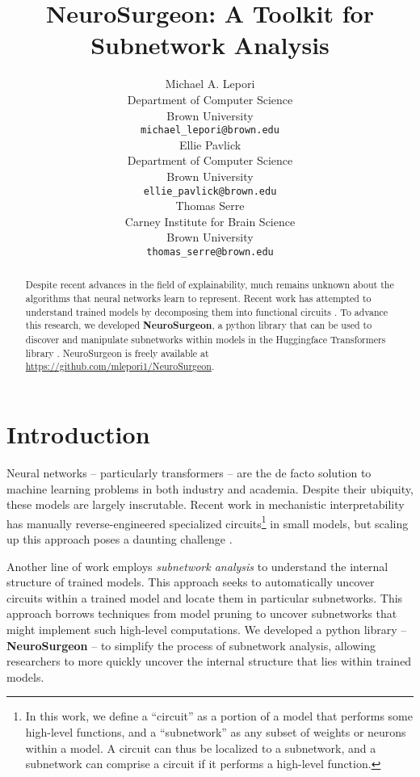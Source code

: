 \documentclass[11pt]{article}
\title{NeuroSurgeon: A Toolkit for Subnetwork Analysis}
\author{Michael A. Lepori \\
Department of Computer Science \\
  Brown University \\
  \texttt{michael\_lepori@brown.edu} \\\And
  Ellie Pavlick \\
Department of Computer Science \\
  Brown University \\
  \texttt{ellie\_pavlick@brown.edu} \\ \AND
  Thomas Serre \\
  Carney Institute for Brain Science\\
  Brown University \\
  \texttt{thomas\_serre@brown.edu}
}
\begin{document}
\maketitle
\begin{abstract}
Despite recent advances in the field of explainability, much remains unknown about the algorithms that neural networks learn to represent. Recent work has attempted to understand trained models by decomposing them into functional circuits \cite{csordas2020neural, lepori2023break}. To advance this research, we developed \textbf{NeuroSurgeon}, a python library that can be used to discover and manipulate subnetworks within models in the Huggingface Transformers library \cite{wolf2019huggingface}. NeuroSurgeon is freely available at \url{https://github.com/mlepori1/NeuroSurgeon}.

\end{abstract}

\section{Introduction}
Neural networks -- particularly transformers \cite{vaswani2017attention} -- are the de facto solution to machine learning problems in both industry and academia.
Despite their ubiquity, these models are largely inscrutable. Recent work in mechanistic interpretability has manually reverse-engineered specialized circuits\footnote{In this work, we define a ``circuit'' as a portion of a model that performs some high-level functions, and a ``subnetwork'' as any subset of weights or neurons within a model. A circuit can thus be localized to a subnetwork, and a subnetwork can comprise a circuit if it performs a high-level function.} in small models, but scaling up this approach poses a daunting challenge \cite{nanda2022progress, merullo2023language, wang2022interpretability, olsson2022context}. 

Another line of work employs \textit{subnetwork analysis} to understand the internal structure of trained models. This approach seeks to automatically uncover circuits within a trained model and locate them in particular subnetworks. This approach borrows techniques from model pruning to uncover subnetworks that might implement such high-level computations. We developed  a python library -- \textbf{NeuroSurgeon} -- to simplify the process of subnetwork analysis, allowing researchers to more quickly uncover the internal structure that lies within trained models. 
\end{document}
